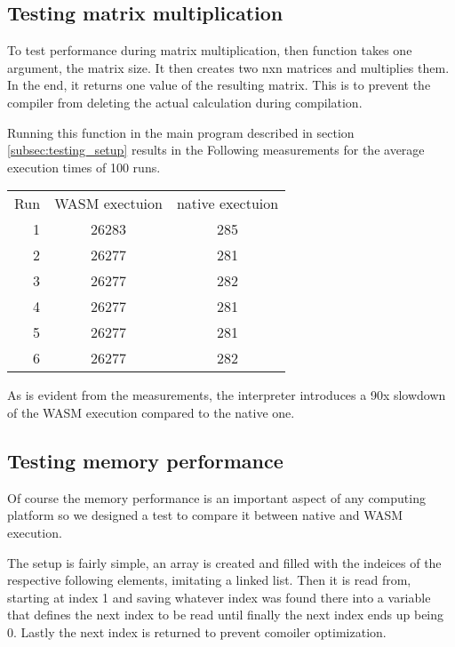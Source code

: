 \subsection{Testing matrix multiplication}
To test performance during matrix multiplication, then function takes one argument, the matrix size. It then creates two nxn matrices and multiplies them. In the end, it returns one value of the resulting matrix. This is to prevent the compiler from deleting the actual calculation during compilation.

Running this function in the main program described in section \ref{subsec:testing_setup} results in the Following measurements for the average execution times of 100 runs.

\begin{tabular}{rcc}
    Run & WASM exectuion & native exectuion \\
    1 & 26283 & 285 \\
    2 & 26277 & 281 \\
    3 & 26277 & 282 \\
    4 & 26277 & 281 \\
    5 & 26277 & 281 \\
    6 & 26277 & 282 \\
\end{tabular}

As is evident from the measurements, the interpreter introduces a 90x slowdown of the WASM execution compared to the native one.
\subsection{Testing memory performance}
Of course the memory performance is an important aspect of any computing platform so we designed a test to compare it between native and WASM execution.

The setup is fairly simple, an array is created and filled with the indeices of the respective following elements, imitating a linked list. Then it is read from, starting at index 1 and saving whatever index was found there into a variable that defines the next index to be read until finally the next index ends up being 0. Lastly the next index is returned to prevent comoiler optimization.
